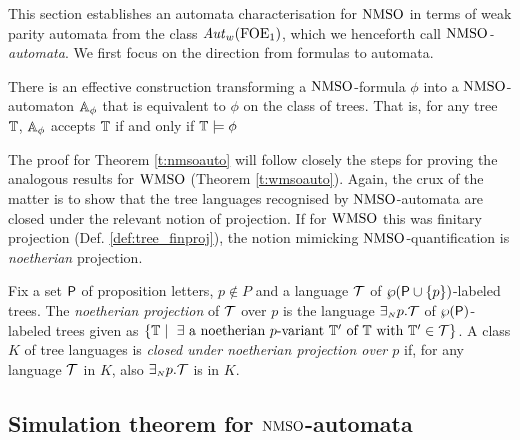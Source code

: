 This section establishes an automata characterisation for $\mathrm{NMSO}$ in terms of weak parity automata from the class $\mathit{Aut}_{w}(\mathrm{FOE}_1)$, which we henceforth call \emph{$\mathrm{NMSO}$-automata}. We first focus on the direction from formulas to automata.

\begin{theorem}
\label{t:nmsoauto}
There is an effective construction transforming a $\mathrm{NMSO}$-formula $\phi$
into a $\mathrm{NMSO}$-automaton $\mathbb{A}_{\phi}$ that is equivalent
to $\phi$ on the class of trees.
That is, for any tree $\mathbb{T}$, $\mathbb{A}_{\phi}$ accepts $\mathbb{T}$ if and only if $\mathbb{T} \models {\phi}$
\end{theorem}

The proof for Theorem \ref{t:nmsoauto} will follow closely the steps for proving the analogous results for $\mathrm{WMSO}$ (Theorem \ref{t:wmsoauto}). Again, the crux of the matter is to show that the tree languages recognised by $\mathrm{NMSO}$-automata are closed under the relevant notion of projection. If for $\mathrm{WMSO}$ this was finitary projection (Def. \ref{def:tree_finproj}), the notion mimicking $\mathrm{NMSO}$-quantification is \emph{noetherian} projection.

\begin{definition}\label{def:tree_finproj}
Fix a set $\mathsf{P}$ of proposition letters, $p \not\in P$ and a language $\mathcal{T}$ of $\wp (\mathsf{P}\cup\{p\})$-labeled
trees.
The \emph{noetherian projection} of $\mathcal{T}$ over $p$ is the language
$\exists_{{\scriptscriptstyle N}} p.\mathcal{T}$ of $\wp (\mathsf{P})$-labeled trees given as $ \{\bbT \mid \text{ $\exists$ a noetherian $p$-variant } \bbT' \text{ of } \bbT \text{ with } \bbT' \in \trees\}$. A class $K$ of tree languages is \emph{closed under noetherian projection over $p$} if, for any language $\mathcal{T}$ in $K$, also ${\exists_{{\scriptscriptstyle N}} p}.\mathcal{T}$ is in $K$.
\end{definition} 

\subsection{Simulation theorem for $\mathrm{NMSO}$-automata}\label{sec:simulation_nmso}

